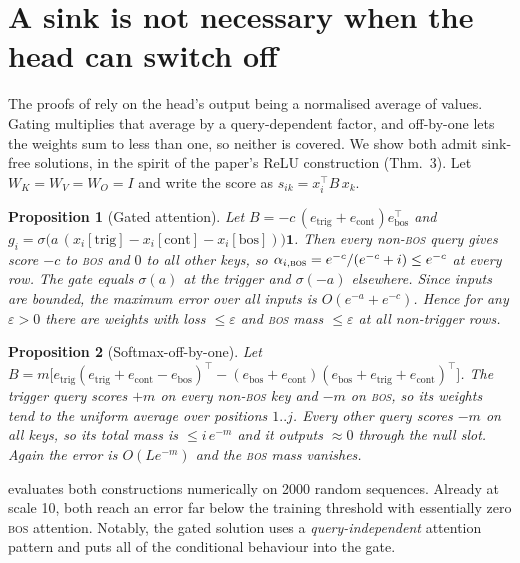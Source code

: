 \documentclass{article} %
\newtheorem{proposition}{Proposition}
\newcommand{\bos}{\textsc{bos}}
\begin{document}
\section{A sink is not necessary when the head can switch off}
\label{sec:constructions}
The proofs of \citet{ranmilo2026sinks} rely on the head's output being a normalised average of values.
Gating multiplies that average by a query-dependent factor, and off-by-one lets the weights sum to less than
one, so neither is covered. We show both admit sink-free solutions, in the spirit of the paper's ReLU
construction (Thm.~3). Let $W_K=W_V=W_O=I$ and write the score as $s_{ik}=x_i^\top B\,x_k$.

\begin{proposition}[Gated attention]
\label{prop:gated}
Let $B=-c\,(e_\text{trig}+e_\text{cont})e_\text{bos}^\top$ and $g_i=\sigma\!\big(a\,(x_i[\text{trig}]-x_i[\text{cont}]-x_i[\text{bos}])\big)\mathbf{1}$.
Then every non-\bos{} query gives score $-c$ to \bos{} and $0$ to all other keys, so
$\alpha_{i,\bos}=e^{-c}/(e^{-c}+i)\le e^{-c}$ at \emph{every} row. The gate equals $\sigma(a)$ at the trigger and
$\sigma(-a)$ elsewhere. Since inputs are bounded, the maximum error over all inputs is $O(e^{-a}+e^{-c})$.
Hence for any $\varepsilon>0$ there are weights with loss $\le\varepsilon$ and \bos{} mass $\le\varepsilon$ at all
non-trigger rows.
\end{proposition}

\begin{proposition}[Softmax-off-by-one]
\label{prop:off}
Let $B=m\big[e_\text{trig}(e_\text{trig}+e_\text{cont}-e_\text{bos})^\top-(e_\text{bos}+e_\text{cont})(e_\text{bos}+e_\text{trig}+e_\text{cont})^\top\big]$.
The trigger query scores $+m$ on every non-\bos{} key and $-m$ on \bos{}, so its weights tend to the uniform
average over positions $1..j$. Every other query scores $-m$ on all keys, so its total mass is
$\le i\,e^{-m}$ and it outputs $\approx0$ through the null slot. Again the error is $O(L e^{-m})$ and the
\bos{} mass vanishes.
\end{proposition}

 evaluates both constructions numerically on 2000 random sequences. Already at scale 10,
both reach an error far below the training threshold with essentially zero \bos{} attention. Notably, the
gated solution uses a \emph{query-independent} attention pattern and puts all of the conditional behaviour
into the gate.
\end{document}
